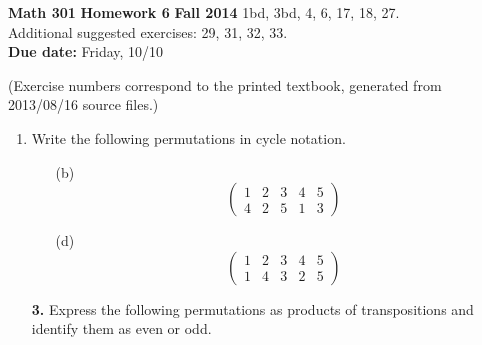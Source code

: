 \documentclass[12pt,reqno]{amsart}
\begin{document}
\thispagestyle{empty}

\noindent \textbf{Math 301} \hskip5cm {\bf Homework 6} \hfill {\bf Fall 2014}
\vskip1cm
   1bd, 3bd, 4, 6, 17, 18, 27.\\  
   Additional suggested exercises: 29, 31, 32, 33.  \\
{\bf Due date:} Friday, 10/10

\medskip

\noindent (Exercise numbers correspond to the printed textbook, generated from 2013/08/16 source files.)

\medskip

\begin{enumerate}[{\bf 1.}]

\item %
Write the following permutations in cycle notation.
\begin{enumerate}

\item[(b)]
\[
\begin{pmatrix}
1 & 2 & 3 & 4 & 5 \\
4 & 2 & 5 & 1 & 3
\end{pmatrix}
\]


\item[(d)]
\[
\begin{pmatrix}
1 & 2 & 3 & 4 & 5 \\
1 & 4 & 3 & 2 & 5
\end{pmatrix}
\]

\end{enumerate}

\vskip2cm
 
\item[{\bf 3.}] 
Express the following permutations as products of transpositions and
identify them as even or odd. 


\end{enumerate}
\end{document}
